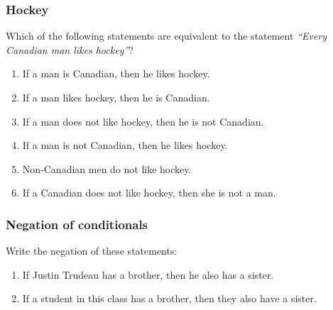 \documentclass[14pt]{beamer}
\begin{document}

\begin{frame}
\frametitle{Hockey}

Which of the following statements are equivalent to the statement \quad
\emph{``Every Canadian man likes hockey''}? 

	\begin{enumerate}
		\item  If a man is Canadian, then he likes hockey.
		\item  If a man likes hockey, then he is Canadian.
		\item  If a man does not like hockey, then he is not Canadian.
		\item  If a man is not Canadian, then he likes hockey.
		\item  Non-Canadian men do not like hockey.
		\item  If a Canadian does not like hockey, then she is not a man.
	\end{enumerate}
\end{frame}


\begin{frame}
\frametitle{Negation of conditionals}

Write the negation of these statements:
	\begin{enumerate}
		\item  If Justin Trudeau has a brother, then he also has a sister.
		\item  If a student in this class has a brother, then they also have a sister.
	\end{enumerate}	
\end{frame}

\end{document}
